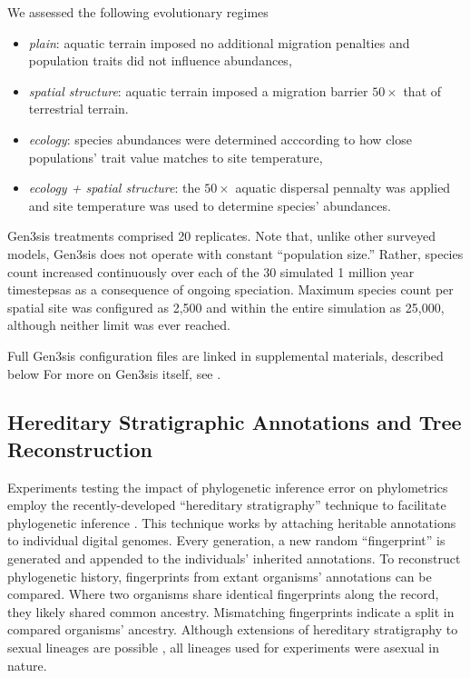 We assessed the following evolutionary regimes
\begin{itemize}
\item \textit{plain}: aquatic terrain imposed no additional migration penalties and population traits did not influence abundances,
\item \textit{spatial structure}: aquatic terrain imposed a migration barrier $50\times$ that of terrestrial terrain.
\item \textit{ecology}: species abundances were determined acccording to how close populations' trait value matches to site temperature,
\item \textit{ecology + spatial structure}: the $50\times$ aquatic dispersal pennalty was applied and site temperature was used to determine species' abundances.
\end{itemize}

Gen3sis treatments comprised 20 replicates.
Note that, unlike other surveyed models, Gen3sis does not operate with constant ``population size.''
Rather, species count increased continuously over each of the 30 simulated 1 million year timestepsas as a consequence of ongoing speciation.
Maximum species count per spatial site was configured as 2,500 and within the entire simulation as 25,000, although neither limit was ever reached.

Full Gen3sis configuration files are linked in supplemental materials, described below
For more on Gen3sis itself, see \citep{hagen2021gen3sis}.

\subsection{Hereditary Stratigraphic Annotations and Tree Reconstruction}

Experiments testing the impact of phylogenetic inference error on phylometrics employ the recently-developed ``hereditary stratigraphy'' technique to facilitate phylogenetic inference \citep{moreno2022hstrat}.
This technique works by attaching heritable annotations to individual digital genomes.
Every generation, a new random ``fingerprint'' is generated and appended to the individuals' inherited annotations.
To reconstruct phylogenetic history, fingerprints from extant organisms' annotations can be compared.
Where two organisms share identical fingerprints along the record, they likely shared common ancestry.
Mismatching fingerprints indicate a split in compared organisms' ancestry.
Although extensions of hereditary stratigraphy to sexual lineages are possible \citep{moreno2024methods}, all lineages used for experiments were asexual in nature.

